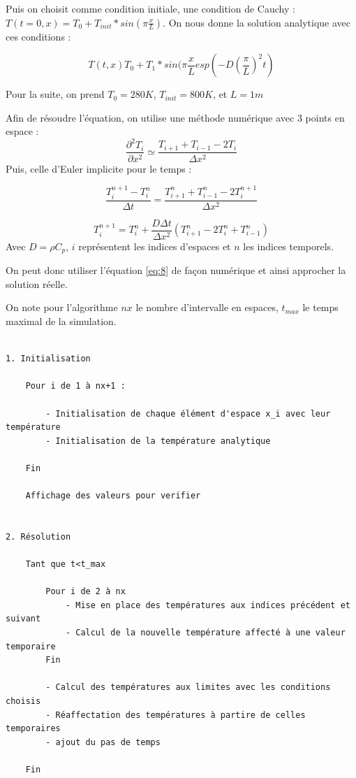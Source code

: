 \documentclass[a4paper,11pt]{article}
\begin{document}
Puis on choisit comme condition initiale, une condition de Cauchy : $T(t=0, x) = T_0 + T_{init}*sin(\pi\frac{x}{L})$.
On nous donne la solution analytique avec ces conditions :

$$ T(t,x)T_0+T_1*sin(\pi \frac{x}{L}esp(-D(\frac{\pi}{L})^2t) $$

Pour la suite, on prend $T_0=280K$, $T_{init}=800K$, et $L=1m$


Afin de résoudre l'équation, on utilise une méthode numérique avec 3 points en espace : 
\begin{equation}\label{eq:7}
    \frac{\partial^2 T_i}{\partial x^2} \simeq \frac{T_{i+1}+T_{i-1}-2T_i}{\Delta x^2}
\end{equation}
Puis, celle d'Euler implicite pour le temps :

$$ \frac{T_i^{n+1}-T_i^n}{\Delta t}= \frac{T_{i+1}^n+T_{i-1}^n-2T_i^{n+1}}{\Delta x^2} $$

\begin{equation}\label{eq:8}
    T_i^{n+1}=T_i^n + \frac{D\Delta t}{\Delta x^2} ( T_{i+1}^n-2T_i^n+T_{i-1}^n)
\end{equation}
Avec $D = \rho C_p$, $i$ représentent les indices d'espaces et $n$ les indices temporels.

On peut donc utiliser l'équation \eqref{eq:8} de façon numérique et ainsi approcher la solution réelle.

On note pour l'algorithme $nx $ le nombre d'intervalle en espaces, $t_{max}$ le temps maximal de la simulation.


\begin{tcolorbox}[colback=gray!10, colframe=black, boxrule=0.5pt]
\footnotesize
\begin{verbatim}

1. Initialisation

    Pour i de 1 à nx+1 :

        - Initialisation de chaque élément d'espace x_i avec leur température 
        - Initialisation de la température analytique

    Fin

    Affichage des valeurs pour verifier


2. Résolution

    Tant que t<t_max
    
        Pour i de 2 à nx
            - Mise en place des températures aux indices précédent et suivant 
            - Calcul de la nouvelle température affecté à une valeur temporaire
        Fin

        - Calcul des températures aux limites avec les conditions choisis 
        - Réaffectation des températures à partire de celles temporaires
        - ajout du pas de temps
        
    Fin


\end{verbatim}
\end{tcolorbox}
\end{document}
